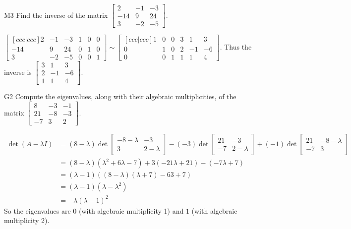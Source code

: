 \documentclass{sbgLAquiz}
\begin{document}
\begin{extract}\newpage\end{extract}
\begin{problem}{M3}
  Find the inverse of the matrix
  \(\begin{bmatrix}
    2 & -1 & -3  \\
    -14 & 9 & 24  \\
    3 & -2 & -5
  \end{bmatrix}\).
\end{problem}
\begin{solution}
  \(\begin{bmatrix}[ccc|ccc]
    2 & -1 & -3 & 1 & 0 & 0 \\
    -14 & 9 & 24 & 0 & 1 & 0 \\
    3 & -2 & -5 & 0 & 0 & 1
  \end{bmatrix}\sim\begin{bmatrix}[ccc|ccc]
    1 & 0 & 0 & 3 & 1 & 3  \\
    0 & 1 & 0 & 2 & -1 & -6  \\
    0 & 0 & 1 & 1 & 1 & 4
  \end{bmatrix}\). Thus the inverse is
  \(\begin{bmatrix}
    3 & 1 & 3  \\
    2 & -1 & -6  \\
    1 & 1 & 4
  \end{bmatrix}\).
\end{solution}
\begin{problem}{G2} 
Compute the eigenvalues, along with their algebraic multiplicities, of the matrix $ \begin{bmatrix} 8 & -3 & -1 \\ 21 & -8 & -3 \\ -7 & 3 & 2\end{bmatrix}$.
\end{problem}
\begin{solution}
\begin{align*}
\det(A-\lambda I) &= (8-\lambda) \det \begin{bmatrix} -8-\lambda & -3 \\ 3 & 2-\lambda \end{bmatrix}-(-3) \det \begin{bmatrix} 21 & -3 \\ -7 & 2-\lambda \end{bmatrix} +(-1) \det \begin{bmatrix} 21 & -8-\lambda \\ -7 & 3 \end{bmatrix} \\
&=(8-\lambda)\left(\lambda ^2+6\lambda-7\right)+3\left(-21\lambda + 21 \right)-\left(-7\lambda +7 \right) \\
&=(\lambda -1) \left( (8-\lambda)(\lambda+7)-63+7 \right) \\
&= (\lambda-1)(\lambda -\lambda ^2) \\
&= -\lambda (\lambda-1)^2
\end{align*}
So the eigenvalues are $0$ (with algebraic multiplicity 1) and $1$ (with algebraic multiplicity 2).
\end{solution}
\end{document}
